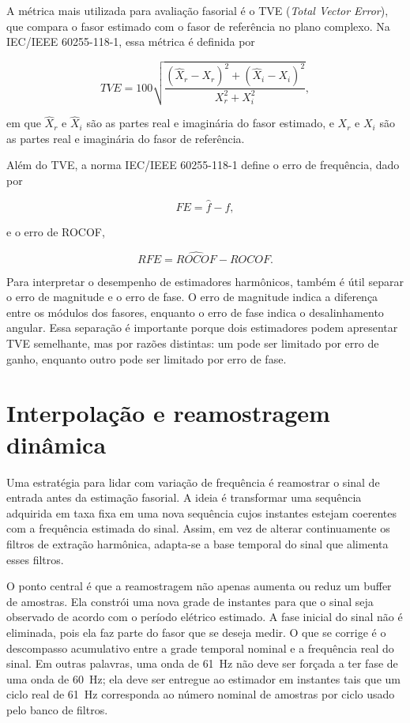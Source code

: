 A métrica mais utilizada para avaliação fasorial é o TVE (\textit{Total Vector Error}), que compara o fasor estimado com o fasor de referência no plano complexo. Na IEC/IEEE 60255-118-1, essa métrica é definida por \cite{iec60255}

\begin{equation}
TVE =
100
\sqrt{
\frac{
\left(\hat{X}_r-X_r\right)^2+
\left(\hat{X}_i-X_i\right)^2
}{
X_r^2+X_i^2
}
},
\label{eq:cap2_tve}
\end{equation}

\noindent em que $\hat{X}_r$ e $\hat{X}_i$ são as partes real e imaginária do fasor estimado, e $X_r$ e $X_i$ são as partes real e imaginária do fasor de referência.

Além do TVE, a norma IEC/IEEE 60255-118-1 define o erro de frequência, dado por \cite{iec60255}

\begin{equation}
FE = \hat{f} - f,
\label{eq:cap2_fe}
\end{equation}

\noindent e o erro de ROCOF,

\begin{equation}
RFE = \widehat{ROCOF} - ROCOF.
\label{eq:cap2_rfe}
\end{equation}

Para interpretar o desempenho de estimadores harmônicos, também é útil separar o erro de magnitude e o erro de fase. O erro de magnitude indica a diferença entre os módulos dos fasores, enquanto o erro de fase indica o desalinhamento angular. Essa separação é importante porque dois estimadores podem apresentar TVE semelhante, mas por razões distintas: um pode ser limitado por erro de ganho, enquanto outro pode ser limitado por erro de fase.

\section{Interpolação e reamostragem dinâmica}

Uma estratégia para lidar com variação de frequência é reamostrar o sinal de entrada antes da estimação fasorial. A ideia é transformar uma sequência adquirida em taxa fixa em uma nova sequência cujos instantes estejam coerentes com a frequência estimada do sinal. Assim, em vez de alterar continuamente os filtros de extração harmônica, adapta-se a base temporal do sinal que alimenta esses filtros.

O ponto central é que a reamostragem não apenas aumenta ou reduz um buffer de amostras. Ela constrói uma nova grade de instantes para que o sinal seja observado de acordo com o período elétrico estimado. A fase inicial do sinal não é eliminada, pois ela faz parte do fasor que se deseja medir. O que se corrige é o descompasso acumulativo entre a grade temporal nominal e a frequência real do sinal. Em outras palavras, uma onda de \SI{61}{Hz} não deve ser forçada a ter fase de uma onda de \SI{60}{Hz}; ela deve ser entregue ao estimador em instantes tais que um ciclo real de \SI{61}{Hz} corresponda ao número nominal de amostras por ciclo usado pelo banco de filtros.

